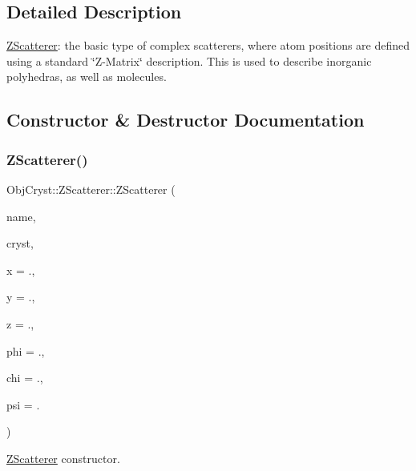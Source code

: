 \subsection{Detailed Description}
\mbox{\hyperlink{class_obj_cryst_1_1_z_scatterer}{Z\+Scatterer}}\+: the basic type of complex scatterers, where atom positions are defined using a standard \char`\"{}\+Z-\/\+Matrix\char`\"{} description. This is used to describe inorganic polyhedras, as well as molecules. 

\subsection{Constructor \& Destructor Documentation}
\mbox{\label{class_obj_cryst_1_1_z_scatterer_a2798124784744758620d1b7838b82af0}} 
\subsubsection{\texorpdfstring{ZScatterer()}{ZScatterer()}\hspace{0.1cm}{\footnotesize\ttfamily [1/2]}}
{\footnotesize\ttfamily Obj\+Cryst\+::\+Z\+Scatterer\+::\+Z\+Scatterer (\begin{DoxyParamCaption}\item[{const string \&}]{name,  }\item[{\mbox{\hyperlink{class_obj_cryst_1_1_crystal}{Crystal}} \&}]{cryst,  }\item[{const R\+E\+AL}]{x = {.},  }\item[{const R\+E\+AL}]{y = {.},  }\item[{const R\+E\+AL}]{z = {.},  }\item[{const R\+E\+AL}]{phi = {.},  }\item[{const R\+E\+AL}]{chi = {.},  }\item[{const R\+E\+AL}]{psi = {.} }\end{DoxyParamCaption})}



\mbox{\hyperlink{class_obj_cryst_1_1_z_scatterer}{Z\+Scatterer}} constructor. 


